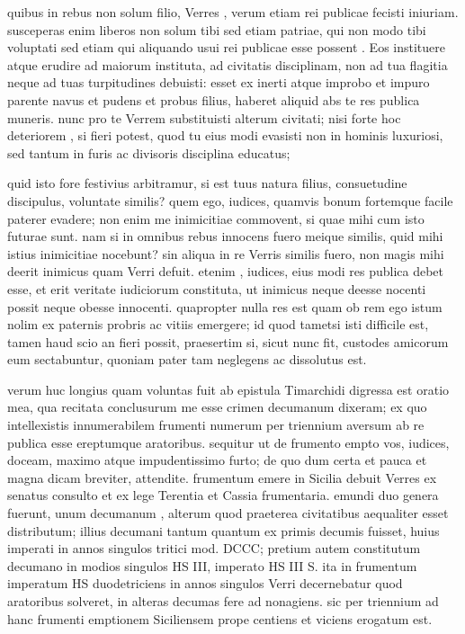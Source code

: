  quibus in rebus non solum filio, Verres , verum etiam rei publicae fecisti iniuriam. susceperas enim liberos non solum tibi sed etiam patriae, qui non modo tibi voluptati sed etiam qui aliquando usui rei publicae esse possent . Eos instituere atque erudire ad maiorum instituta, ad civitatis disciplinam, non ad tua flagitia neque ad tuas turpitudines debuisti: esset ex inerti atque improbo et impuro parente navus et pudens et probus filius, haberet aliquid abs te res publica muneris. nunc pro te Verrem substituisti alterum civitati; nisi forte hoc deteriorem , si fieri potest, quod tu eius modi evasisti non in hominis luxuriosi, sed tantum in furis ac divisoris disciplina educatus;

 quid isto fore festivius arbitramur, si est tuus natura filius, consuetudine discipulus, voluntate similis? quem ego, iudices, quamvis bonum fortemque facile paterer evadere; non enim me inimicitiae commovent, si quae mihi cum isto futurae sunt. nam si in omnibus rebus innocens fuero meique similis, quid mihi istius inimicitiae nocebunt? sin aliqua in re Verris similis fuero, non magis mihi deerit inimicus quam Verri defuit. etenim , iudices, eius modi res publica debet esse, et erit veritate iudiciorum constituta, ut inimicus neque deesse nocenti possit neque obesse innocenti. quapropter nulla res est quam ob rem ego istum nolim ex paternis probris ac vitiis emergere; id quod tametsi isti difficile est, tamen haud scio an fieri possit, praesertim si, sicut nunc fit, custodes amicorum eum sectabuntur, quoniam pater tam neglegens ac dissolutus est.

 verum huc longius quam voluntas fuit ab epistula Timarchidi digressa est oratio mea, qua recitata conclusurum me esse crimen decumanum dixeram; ex quo intellexistis innumerabilem frumenti numerum per triennium aversum ab re publica esse ereptumque aratoribus. sequitur ut de frumento empto vos, iudices, doceam, maximo atque impudentissimo furto; de quo dum certa et pauca et magna dicam breviter, attendite. frumentum emere in Sicilia debuit Verres ex senatus consulto et ex lege Terentia et Cassia frumentaria. emundi duo genera fuerunt, unum decumanum , alterum quod praeterea civitatibus aequaliter esset distributum; illius decumani tantum quantum ex primis decumis fuisset, huius imperati in annos singulos tritici mod. DCCC; pretium autem constitutum decumano in modios singulos HS III, imperato HS III S. ita in frumentum imperatum HS duodetriciens in annos singulos Verri decernebatur quod aratoribus solveret, in alteras decumas fere ad nonagiens. sic per triennium ad hanc frumenti emptionem Siciliensem prope centiens et viciens erogatum est.


